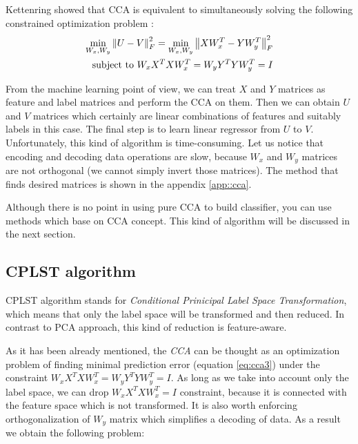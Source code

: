Kettenring showed that CCA is equivalent to simultaneously solving the following constrained optimization problem \cite{ChenLin}:
\begin{equation}\label{eq:cca3}
\begin{split}
    \min_{W_x, W_y} \left\lVert U-V\right\rVert_{F}^2 = \min_{W_x, W_y} \left\lVert XW_x^T-YW_y^T\right\rVert_{F}^2 \\ 
    \text{   subject to   } W_xX^TXW_x^T=W_yY^TYW_y^T=I   
\end{split}
\end{equation}

From the machine learning point of view, we can treat $X$ and $Y$ matrices as feature and label matrices and perform the CCA on them. Then we can obtain $U$ and $V$ matrices which certainly are linear combinations of features and suitably labels in this case. The final step is to learn linear regressor from $U$ to $V$. Unfortunately, this kind of algorithm is time-consuming. Let us notice that encoding and decoding data operations are slow, because $W_x$ and $W_y$ matrices are not orthogonal (we cannot simply invert those matrices). The method that finds desired matrices is shown in the appendix \ref{app::cca}. 

Although there is no point in using pure CCA to build classifier, you can use methods which base on CCA concept. This kind of algorithm will be discussed in the next section.

\subsection{CPLST algorithm}

CPLST algorithm stands for \textit{Conditional Prinicipal Label Space Transformation}, which means that only the label space will be transformed and then reduced. In contrast to PCA approach, this kind of reduction is feature-aware. 

As it has been already mentioned, the \textit{CCA} can be thought as an optimization problem of finding minimal prediction error (equation \ref{eq:cca3}) under the constraint $W_xX^TXW_x^T=W_yY^TYW_y^T=I$. As long as we take into account only the label space, we can drop $W_xX^TXW_x^T=I$ constraint, because it is connected with the feature space which is not transformed. It is also worth enforcing orthogonalization of $W_y$ matrix which simplifies a decoding of data. As a result we obtain the following problem:

